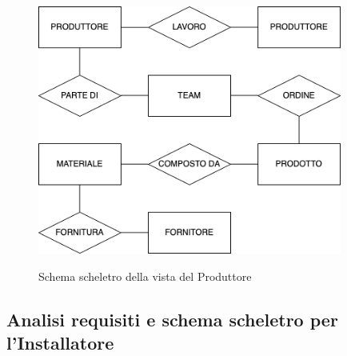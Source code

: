 \documentclass{article}
\begin{document}
\begin{figure}[H]
    \centering
    \includegraphics[width=10cm]{images/produttore.drawio.png}\\
    \caption{Schema scheletro della vista del Produttore}
\end{figure}

\subsection{Analisi requisiti e schema scheletro per l'Installatore}
\end{document}

